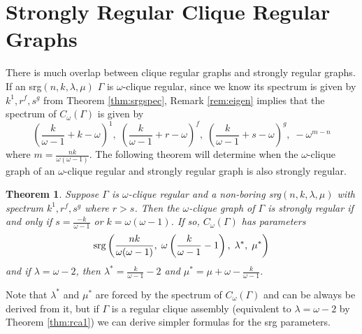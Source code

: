 \documentclass[12pt]{report}
\newtheorem{thm}{Theorem}[chapter]
\theoremstyle{definition}
\begin{document}
 \section{Strongly Regular Clique Regular Graphs}\label{sec:srgcrg}
 There is much overlap between clique regular graphs and strongly regular graphs. If an srg$(n,k,\lambda,\mu)$ $\Gamma$ is $\omega$-clique regular, since we know its spectrum is given by $k^1,r^f,s^g$ from Theorem \ref{thm:srgspec}, Remark \ref{rem:eigen} implies that the spectrum of $C_\omega(\Gamma)$ is given by \begin{equation}\label{eq:spec}\left(\frac{k}{\omega-1}+k-\omega \right)^1,\;\left(\frac{k}{\omega-1}+r-\omega\right)^f,\;  \left(\frac{k}{\omega-1}+s-\omega\right)^g, \;-\omega^{m-n} \end{equation} where $m=\frac{nk}{\omega(\omega-1)}$.  The following theorem will determine when the $\omega$-clique graph of an $\omega$-clique regular and strongly regular graph is also strongly regular. 
\begin{thm} \label{thm:srg}
    Suppose $\Gamma$ is $\omega$-clique regular and a non-boring \textnormal{srg}$(n,k,\lambda, \mu)$ with spectrum $k^1,r^f,s^g$ where $r>s$. Then the $\omega$-clique graph of $\Gamma$ is strongly regular if and only if $s = \frac{-k}{\omega-1}$ or $k = \omega(\omega -1)$. If so, $C_\omega(\Gamma)$ has parameters
    $$\textnormal{srg}\left( \frac{nk}{\omega(\omega -1)},\; \omega \left(\frac{k}{\omega-1}-1\right),\; \lambda^*,\; \mu^* \right)$$
    and if $\lambda = \omega - 2$, then $\lambda^* = \frac{k}{\omega -1}-2$ and $\mu^*=\mu +\omega-\frac{k}{\omega-1}$.
\end{thm}
Note that $\lambda^*$ and $\mu^*$ are forced by the spectrum of $C_\omega(\Gamma)$ and can be always be derived from it, but if $\Gamma$ is a regular clique assembly (equivalent to $\lambda = \omega - 2$ by Theorem \ref{thm:rca1}) we can derive simpler formulas for the srg parameters.
\end{document}
